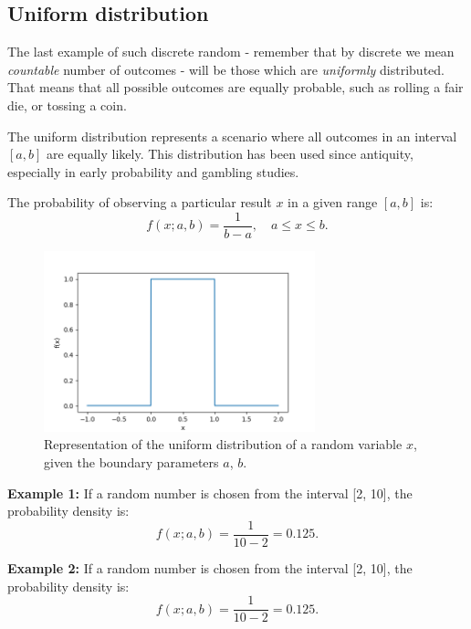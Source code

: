 \documentclass{book}
\begin{document}
\newpage
\subsection{Uniform distribution}
The last example of such discrete random - remember that by discrete we mean \textit{countable} number of outcomes -  will be those which are \textit{uniformly} distributed. That means that all possible outcomes are equally probable, such as rolling a fair die, or tossing a coin.

The uniform distribution represents a scenario where all outcomes in an interval $[a, b]$ are equally likely. This distribution has been used since antiquity, especially in early probability and gambling studies.

The probability of observing a particular result $x$ in a given range $[a, b]$ is:
\begin{equation}
    f(x; a, b) = \frac{1}{b-a}, \quad a \leq x \leq b.
\end{equation}

\begin{figure}[ht]
    \centering
    \includegraphics[width=0.7\textwidth]{figures/chapter2/uniform.png}
    \caption{Representation of the uniform distribution of a random variable $x$, given the boundary parameters $a$, $b$.}
    \label{fig:random}
\end{figure}

\textbf{Example 1:} If a random number is chosen from the interval [2, 10], the probability density is:
\begin{equation}
    f(x; a, b) = \frac{1}{10-2} = 0.125.
\end{equation}

\textbf{Example 2:} If a random number is chosen from the interval [2, 10], the probability density is:
\begin{equation}
    f(x; a, b) = \frac{1}{10-2} = 0.125.
\end{equation}
\end{document}
